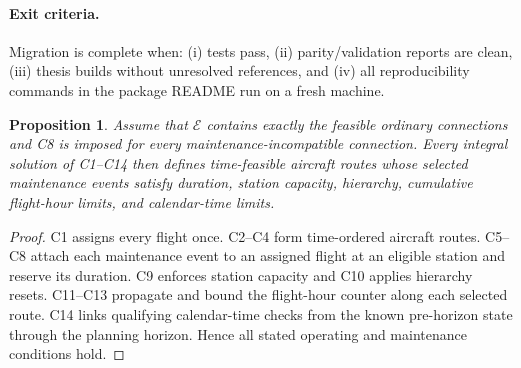 \documentclass[11pt,a4paper]{article}
\newtheorem{proposition}{Proposition}
\newcommand{\Eset}{\mathcal{E}}
\begin{document}
\paragraph{Exit criteria.}
Migration is complete when: (i) tests pass, (ii) parity/validation reports are
clean, (iii) thesis builds without unresolved references, and (iv) all
reproducibility commands in the package README run on a fresh machine.

\begin{proposition}
Assume that $\Eset$ contains exactly the feasible ordinary connections and C8
is imposed for every maintenance-incompatible connection. Every integral
solution of C1--C14 then defines time-feasible aircraft routes whose selected
maintenance events satisfy duration, station capacity, hierarchy, cumulative
flight-hour limits, and calendar-time limits.
\end{proposition}

\begin{proof}
C1 assigns every flight once. C2--C4 form time-ordered aircraft routes.
C5--C8 attach each maintenance event to an assigned flight at an eligible
station and reserve its duration. C9 enforces station capacity and C10 applies
hierarchy resets. C11--C13 propagate and bound the flight-hour counter along
each selected route. C14 links qualifying calendar-time checks from the known
pre-horizon state through the planning horizon. Hence all stated operating and
maintenance conditions hold.
\end{proof}
\end{document}
